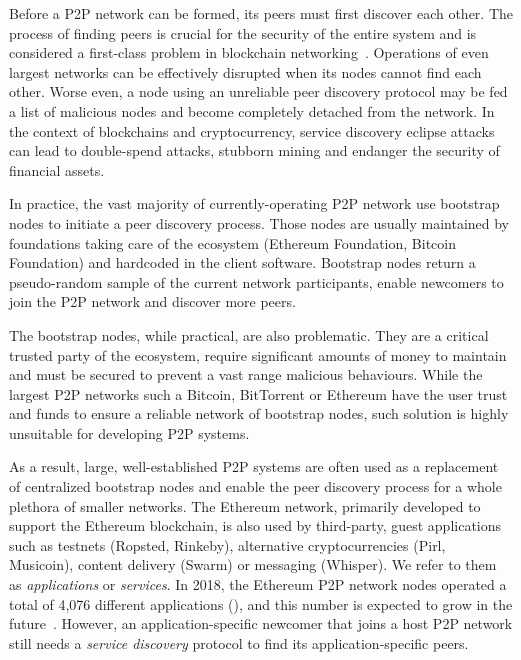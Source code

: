 Before a P2P network can be formed, its peers must first discover each other. The process of finding peers is crucial for the security of the entire system and is considered a first-class problem in blockchain networking~\cite{dotan2021survey}. Operations of even largest networks can be effectively disrupted when its nodes cannot find each other. Worse even, a node using an unreliable peer discovery protocol may be fed a list of malicious nodes and become completely detached from the network. In the context of blockchains and cryptocurrency, service discovery eclipse attacks can lead to double-spend attacks, stubborn mining and endanger the security of financial assets. 

In practice, the vast majority of currently-operating P2P network use bootstrap nodes to initiate a peer discovery process. Those nodes are usually maintained by foundations taking care of the ecosystem (\eg Ethereum Foundation, Bitcoin Foundation) and hardcoded in the client software. Bootstrap nodes return a pseudo-random sample of the current network participants, enable newcomers to join the P2P network and discover more peers. 

The bootstrap nodes, while practical, are also problematic. They are a critical trusted party of the ecosystem, require significant amounts of money to maintain and must be secured to prevent a vast range malicious behaviours. While the largest P2P networks such a Bitcoin, BitTorrent or Ethereum have the user trust and funds to ensure a reliable network of bootstrap nodes, such solution is highly unsuitable for developing P2P systems.

As a result, large, well-established P2P systems are often used as a replacement of centralized bootstrap nodes and enable the peer discovery process for a whole plethora of smaller networks. The Ethereum network, primarily developed to support the Ethereum blockchain, is also used by third-party, guest applications such as testnets (Ropsted, Rinkeby), alternative cryptocurrencies (Pirl, Musicoin), content delivery (Swarm) or messaging (Whisper). We refer to them as \emph{applications} or \emph{services}. In 2018, the Ethereum P2P network nodes operated a total of 4,076 different applications (), and this number is expected to grow in the future~\cite{kim2018measuring}. However, an application-specific newcomer that joins a host P2P network still needs a \emph{service discovery} protocol to find its application-specific peers. 

